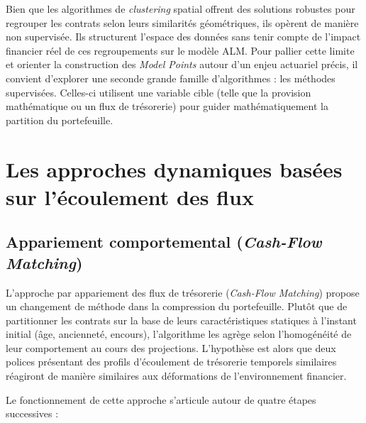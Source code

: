 Bien que les algorithmes de \textit{clustering} spatial offrent des solutions robustes pour regrouper les contrats selon leurs similarités géométriques, ils opèrent de manière non supervisée. Ils structurent l'espace des données sans tenir compte de l'impact financier réel de ces regroupements sur le modèle ALM. Pour pallier cette limite et orienter la construction des \textit{Model Points} autour d'un enjeu actuariel précis, il convient d'explorer une seconde grande famille d'algorithmes : les méthodes supervisées. Celles-ci utilisent une variable cible (telle que la provision mathématique ou un flux de trésorerie) pour guider mathématiquement la partition du portefeuille.

\section{Les approches dynamiques basées sur l'écoulement des flux}

\subsection{Appariement comportemental (\textit{Cash-Flow Matching})}
\label{sec:methodo_cf_matching}

L'approche par appariement des flux de trésorerie (\textit{Cash-Flow Matching}) propose un changement de méthode dans la compression du portefeuille. Plutôt que de partitionner les contrats sur la base de leurs caractéristiques statiques à l'instant initial (âge, ancienneté, encours), l'algorithme les agrège selon l'homogénéité de leur comportement au cours des projections. L'hypothèse est alors que deux polices présentant des profils d'écoulement de trésorerie temporels similaires réagiront de manière similaires aux déformations de l'environnement financier.

Le fonctionnement de cette approche s'articule autour de quatre étapes successives :

